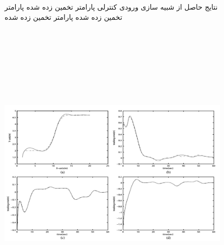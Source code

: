 \begin{figure}[h]
\begin{center}
{			\label{3D-a4}
		}
	\end{center}
	\caption{
		نتایج حاصل از شبیه سازی
		 ورودی کنترلی
		 پارامتر تخمین زده شده
		 پارامتر تخمین زده شده
		 پارامتر تخمین زده شده
	}
\end{figure}
\begin{figure}[h]
	\centering
	\includegraphics[height=15cm,width=15cm]{img/article_result1}
\end{figure}
